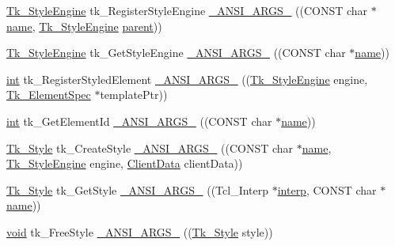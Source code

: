 \begin{DoxyCompactItemize}
\item 
\hyperlink{tk_8h_a5548a72d8f6b89a6fb29c011e02df14f}{Tk\+\_\+\+Style\+Engine} tk\+\_\+\+Register\+Style\+Engine \hyperlink{struct_tk_stubs_ab61667117169a742cd5777dcce6550bd}{\+\_\+\+A\+N\+S\+I\+\_\+\+A\+R\+G\+S\+\_\+} ((C\+O\+N\+ST char $\ast$\hyperlink{tk_8h_a2946c588fc7fa2fa5b43ac54b7872725}{name}, \hyperlink{tk_8h_a5548a72d8f6b89a6fb29c011e02df14f}{Tk\+\_\+\+Style\+Engine} \hyperlink{tk_8h_a5bd0fe2ecadcfa6c142914cb359aea47}{parent}))
\item 
\hyperlink{tk_8h_a5548a72d8f6b89a6fb29c011e02df14f}{Tk\+\_\+\+Style\+Engine} tk\+\_\+\+Get\+Style\+Engine \hyperlink{struct_tk_stubs_a995050b60a9dc0254f504cbf528db76c}{\+\_\+\+A\+N\+S\+I\+\_\+\+A\+R\+G\+S\+\_\+} ((C\+O\+N\+ST char $\ast$\hyperlink{tk_8h_a2946c588fc7fa2fa5b43ac54b7872725}{name}))
\item 
\hyperlink{tk_8h_a83f82f76e7fed06f4c49d2db94028a6d}{int} tk\+\_\+\+Register\+Styled\+Element \hyperlink{struct_tk_stubs_a6c7fe30e4150b0c22429b2766e4a8521}{\+\_\+\+A\+N\+S\+I\+\_\+\+A\+R\+G\+S\+\_\+} ((\hyperlink{tk_8h_a5548a72d8f6b89a6fb29c011e02df14f}{Tk\+\_\+\+Style\+Engine} engine, \hyperlink{struct_tk___element_spec}{Tk\+\_\+\+Element\+Spec} $\ast$template\+Ptr))
\item 
\hyperlink{tk_8h_a83f82f76e7fed06f4c49d2db94028a6d}{int} tk\+\_\+\+Get\+Element\+Id \hyperlink{struct_tk_stubs_abf70c7a66b3cb902dea93a8a0277582f}{\+\_\+\+A\+N\+S\+I\+\_\+\+A\+R\+G\+S\+\_\+} ((C\+O\+N\+ST char $\ast$\hyperlink{tk_8h_a2946c588fc7fa2fa5b43ac54b7872725}{name}))
\item 
\hyperlink{tk_8h_aa71c7ce9e7b5bd71b0a8afd9fdb6e860}{Tk\+\_\+\+Style} tk\+\_\+\+Create\+Style \hyperlink{struct_tk_stubs_a1e8c7067f5352ad3d54a9ecc7d7a7d57}{\+\_\+\+A\+N\+S\+I\+\_\+\+A\+R\+G\+S\+\_\+} ((C\+O\+N\+ST char $\ast$\hyperlink{tk_8h_a2946c588fc7fa2fa5b43ac54b7872725}{name}, \hyperlink{tk_8h_a5548a72d8f6b89a6fb29c011e02df14f}{Tk\+\_\+\+Style\+Engine} engine, \hyperlink{tk_8h_accf84b4d725a8f41e04d6333768a6001}{Client\+Data} client\+Data))
\item 
\hyperlink{tk_8h_aa71c7ce9e7b5bd71b0a8afd9fdb6e860}{Tk\+\_\+\+Style} tk\+\_\+\+Get\+Style \hyperlink{struct_tk_stubs_ac4e994945117e52202d8cf10a30f8277}{\+\_\+\+A\+N\+S\+I\+\_\+\+A\+R\+G\+S\+\_\+} ((Tcl\+\_\+\+Interp $\ast$\hyperlink{tk_8h_a5ab79c0f5849ee8e6a2e955a6c536cc0}{interp}, C\+O\+N\+ST char $\ast$\hyperlink{tk_8h_a2946c588fc7fa2fa5b43ac54b7872725}{name}))
\item 
\hyperlink{tk_8h_aba408b7cd755a96426e004c015f5de8e}{void} tk\+\_\+\+Free\+Style \hyperlink{struct_tk_stubs_a83d6de3b97a87ef8b490576c8bfe7d12}{\+\_\+\+A\+N\+S\+I\+\_\+\+A\+R\+G\+S\+\_\+} ((\hyperlink{tk_8h_aa71c7ce9e7b5bd71b0a8afd9fdb6e860}{Tk\+\_\+\+Style} style))

\end{DoxyCompactItemize}
